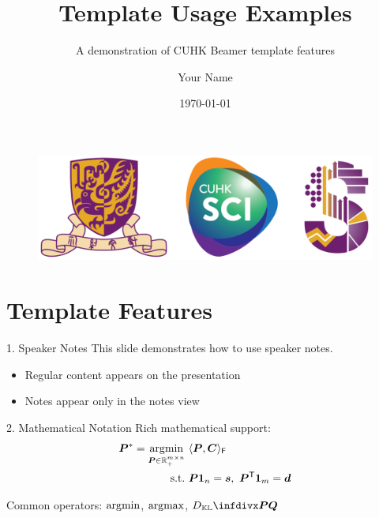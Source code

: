 \documentclass[10pt]{beamer}
\author{
Your Name
}
\title{
Template Usage Examples
}
\subtitle{
A demonstration of CUHK Beamer template features
}
\institute[Short Name]{
Your Institute Name
}
\date{\today}
\begin{document}
\begin{frame}
    \titlepage
    \vfill
    \begin{figure}
        \begin{center}
            \includegraphics[width=0.3\linewidth]{pic/STAT_SFO_CU_logo_en_chi_small.png}
        \end{center}
    \end{figure}
\end{frame}

\section{Template Features}

\begin{frame}{1. Speaker Notes}
    This slide demonstrates how to use speaker notes.
    
    \begin{itemize}
        \item Regular content appears on the presentation
        \item Notes appear only in the notes view
    \end{itemize}
\end{frame}


\begin{frame}{2. Mathematical Notation}
    Rich mathematical support:
    \begin{align}
        \bm{P}^*=\operatorname*{\arg\!min}_{\bm{P}\in\mathbb{R}_+^{m\times n}} & ~ \langle\bm{P},\bm{C}\rangle_\mathsf{F} \\
        \text{s.t.} & ~ \bm{P1}_n = \bm{s},~ \bm{P}^\mathsf{T}\bm{1}_m = \bm{d}
    \end{align}
    
    Common operators: $\operatorname*{\arg\!min}$, $\operatorname*{\arg\!max}$, $\infdiv{\bm{P}}{\bm{Q}}$
\end{frame}

\end{document}
